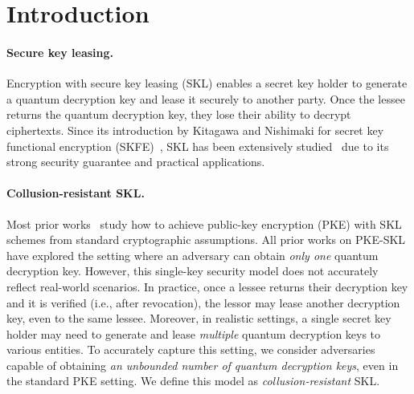 


\section{Introduction}\label{sec:intro}

\paragraph{Secure key leasing.}
Encryption with secure key leasing (SKL) enables a secret key holder to generate a quantum decryption key and lease it securely to another party.
Once the lessee returns the quantum decryption key, they lose their ability to decrypt ciphertexts.
Since its introduction by Kitagawa and Nishimaki for secret key functional encryption (SKFE)~\cite{AC:KitNis22}, SKL has been extensively studied~\cite{EC:AKNYY23,TCC:AnaPorVai23,EPRINT:CGJL23,EPRINT:MorPorYam23,TCC:AnaHuHua24,EC:BGKMRR24,myEPRINT:KitMorYam24} due to its strong security guarantee and practical applications.

\paragraph{Collusion-resistant SKL.}
Most prior works~\cite{EC:AKNYY23,TCC:AnaPorVai23,EPRINT:CGJL23,EPRINT:MorPorYam23,TCC:AnaHuHua24} study how to achieve public-key encryption (PKE) with SKL schemes from standard cryptographic assumptions. All prior works on PKE-SKL have explored the setting where an adversary can obtain \emph{only one} quantum decryption key.
However, this single-key security model does not accurately reflect real-world scenarios. In practice, once a lessee returns their decryption key and it is verified (i.e., after revocation), the lessor may lease another decryption key, even to the same lessee. Moreover, in realistic settings, a single secret key holder may need to generate and lease \emph{multiple} quantum decryption keys to various entities. To accurately capture this setting, we consider adversaries capable of obtaining \emph{an unbounded number of quantum decryption keys}, even in the standard PKE setting.
We define this model as \emph{collusion-resistant} SKL.

